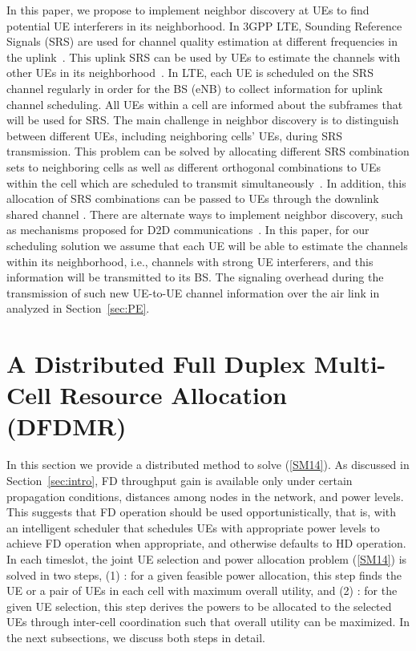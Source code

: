 \documentclass[journal]{IEEEtran}
\begin{document}
In this paper, we propose to implement neighbor discovery at UEs to find potential UE interferers in its neighborhood. In 3GPP LTE, Sounding Reference Signals (SRS) are used for channel quality estimation at different frequencies in the uplink~\cite{DahlmanLTE}. This uplink SRS can be used by UEs to estimate the channels with other UEs in its neighborhood~\cite{D2DneighborDisSRS}. In LTE, each UE is scheduled on the SRS channel regularly in order for the BS (eNB) to collect information for uplink channel scheduling. All UEs within a cell are informed about the subframes that will be used for SRS. The main challenge in neighbor discovery is to distinguish between different UEs, including neighboring cells' UEs, during SRS transmission. This problem can be solved by allocating different SRS combination sets to neighboring cells as well as different orthogonal combinations to UEs within the cell which are scheduled to transmit simultaneously~\cite{DahlmanLTE}. In addition, this allocation of SRS combinations can be passed to UEs through the downlink shared channel \cite{D2DneighborDisSRS}. There are alternate ways to implement neighbor discovery, such as mechanisms proposed for D2D communications~\cite{D2DneighborDisDMRS, D2DneighborDisFlashLinq}. In this paper, for our scheduling solution we assume that each UE will be able to estimate the channels within its neighborhood, i.e., channels with strong UE interferers, and this information will be transmitted to its BS. The signaling overhead during the transmission of such new UE-to-UE channel information over the air link in analyzed in Section~\ref{sec:PE}.

\section{A Distributed Full Duplex Multi-Cell Resource Allocation (DFDMR)}\label{sec:DFDMR}
In this section we provide a distributed method to solve (\ref{SM14}). As discussed in Section~\ref{sec:intro}, FD throughput gain is available only under certain propagation conditions, distances among nodes in the network, and power levels. This suggests that FD operation should be used opportunistically, that is, with an intelligent scheduler that schedules UEs with appropriate power levels to achieve FD operation when appropriate, and otherwise defaults to HD operation. In each timeslot, the joint UE selection and power allocation problem (\ref{SM14}) is solved in two steps, (1) : for a given feasible power allocation, this step finds the UE or a pair of UEs in each cell with maximum overall utility, and (2) : for the given UE selection, this step derives the powers to be allocated to the selected UEs through inter-cell coordination such that overall utility can be maximized. In the next subsections, we discuss both steps in detail. 
\end{document}
